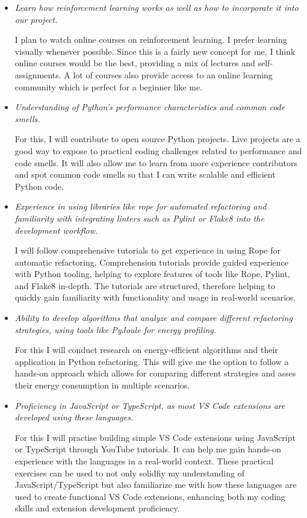 \documentclass[12pt]{article}
\begin{document}
\begin{itemize}[label={}, wide=0pt, leftmargin=*]

\item \textit{Learn how reinforcement learning works as well as how to incorporate it into our project.}

I plan to watch online courses on reinforcement learning. I prefer learning visually whenever possible. Since this is a fairly new concept for me, I think online courses would be the best, providing a mix of lectures and self-assignments. A lot of courses also provide access to an online learning community which is perfect for a beginner like me.


\item \textit{Understanding of Python's performance characteristics and common code smells.}

For this, I will contribute to open source Python projects. Live projects are a good way to expose to practical coding challenges related to performance and code smells. It will also allow me to learn from more experience contributors and spot common code smells so that I can write scalable and efficient Python code.

\item \textit{Experience in using libraries like rope for automated refactoring and familiarity with integrating linters such as Pylint or Flake8 into the development workflow.} 

I will follow comprehensive tutorials to get experience in using Rope for automatic refactoring. Comprehension tutorials provide guided experience with Python tooling, helping to explore features of tools like Rope, Pylint, and Flake8 in-depth.  The tutorials are structured, therefore helping to quickly gain familiarity with functionality and usage in real-world scenarios.

\item \textit{Ability to develop algorithms that analyze and compare different refactoring strategies, using tools like PyJoule for energy profiling.}

For this I will conduct research on energy-efficient algorithms and their application in Python refactoring. This will give me the option to follow a hands-on approach which allows for comparing different strategies and asses their energy consumption in multiple scenarios.

\item \textit{Proficiency in JavaScript or TypeScript, as most VS Code extensions are developed using these languages.}

For this I will practise building simple VS Code extensions using JavaScript or TypeScript through YouTube tutorials. It can help me gain hands-on experience with the languages in a real-world context. These practical exercises can be used to not only solidfiy my understanding of JavaScript/TypeScript but also familiarize me with how these languages are used to create functional VS Code extensions, enhancing both my coding skills and extension development proficiency.

\end{itemize}
\end{document}
